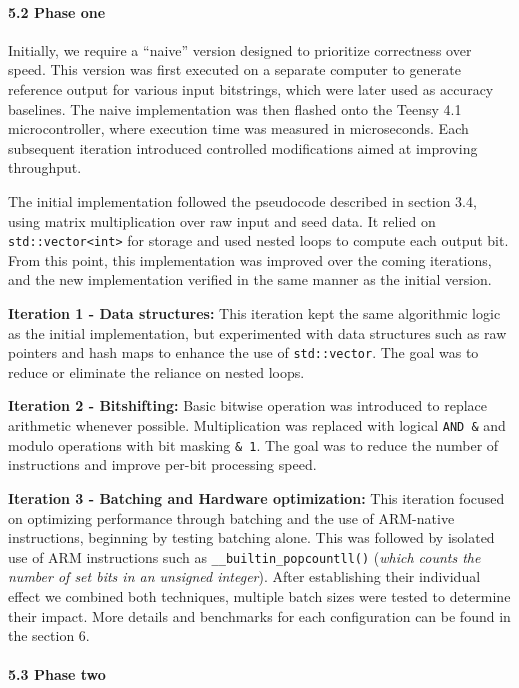 \documentclass{sigchi}
\begin{document}
\paragraph{5.2 Phase one}\label{phase-one}

Initially, we require a ``naive'' version designed to prioritize correctness over speed. This version was first executed on a separate computer to generate reference output for various input bitstrings, which were later used as accuracy baselines. The naive implementation was then flashed onto the Teensy 4.1 microcontroller, where execution time was measured in microseconds. Each subsequent iteration introduced controlled modifications aimed at improving throughput.

The initial implementation followed the pseudocode described in section 3.4, using matrix multiplication over raw input and seed data. It relied on \texttt{std::vector\textless{}int\textgreater{}} for storage and used nested loops to compute each output bit. From this point, this implementation was improved over the coming iterations, and the new implementation verified in the same manner as the initial version.

\textbf{Iteration 1 - Data structures:} This iteration kept the same algorithmic logic as the initial implementation, but experimented with data structures such as raw pointers and hash maps to enhance the use of \texttt{std::vector}. The goal was to reduce or eliminate the reliance on nested loops.

\textbf{Iteration 2 - Bitshifting:} Basic bitwise operation was introduced to replace arithmetic whenever possible. Multiplication was replaced with logical \texttt{AND\ \&} and modulo operations with bit masking \texttt{\&\ 1}. The goal was to reduce the number of instructions and improve per-bit processing speed.

\textbf{Iteration 3 - Batching and Hardware optimization:} This iteration focused on optimizing performance through batching and the use of ARM-native instructions, beginning by testing batching alone. This was followed by isolated use of ARM instructions such as \texttt{\_\_builtin\_popcountll()} (\emph{which counts the number of set bits in an unsigned integer}). After establishing their individual effect we combined both techniques, multiple batch sizes were tested to determine their impact. More details and benchmarks for each configuration can be found in the section 6.

\paragraph{5.3 Phase two}\label{phase-two}
\end{document}
